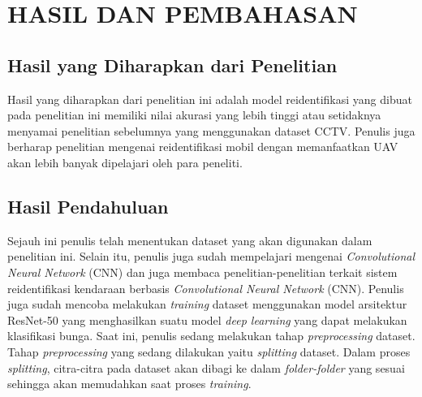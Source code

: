 \chapter{HASIL DAN PEMBAHASAN}

\section{Hasil yang Diharapkan dari Penelitian}

Hasil yang diharapkan dari penelitian ini adalah model reidentifikasi yang dibuat pada penelitian ini memiliki nilai akurasi yang lebih tinggi atau setidaknya menyamai penelitian sebelumnya yang menggunakan dataset CCTV. Penulis juga berharap penelitian mengenai reidentifikasi mobil dengan memanfaatkan UAV akan lebih banyak dipelajari oleh para peneliti.

\section{Hasil Pendahuluan}

Sejauh ini penulis telah menentukan dataset yang akan digunakan dalam penelitian ini. Selain itu, penulis juga sudah mempelajari mengenai \emph{Convolutional Neural Network} (CNN) dan juga membaca penelitian-penelitian terkait sistem reidentifikasi kendaraan berbasis \emph{Convolutional Neural Network} (CNN). Penulis juga sudah mencoba melakukan \emph{training} dataset menggunakan model arsitektur ResNet-50 yang menghasilkan suatu model \emph{deep learning} yang dapat melakukan klasifikasi bunga. Saat ini, penulis sedang melakukan tahap \emph{preprocessing} dataset. Tahap \emph{preprocessing} yang sedang dilakukan yaitu \emph{splitting} dataset. Dalam proses \emph{splitting}, citra-citra pada dataset akan dibagi ke dalam \emph{folder-folder} yang sesuai sehingga akan memudahkan saat proses \emph{training}.
